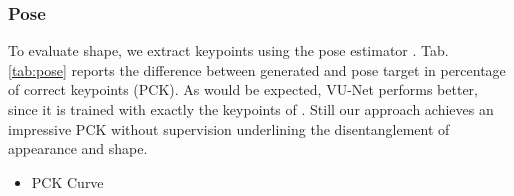 	\subsubsection{Pose}
	To evaluate shape, we extract keypoints using the pose estimator \cite{cao17affinityfield}. Tab. \ref{tab:pose} reports the difference between generated and pose target in percentage of correct keypoints (PCK). As would be expected, VU-Net performs better, since it is trained with exactly the keypoints of \cite{cao17affinityfield}. Still our approach achieves an impressive PCK without supervision underlining the disentanglement of appearance and shape.

	\begin{itemize}
		\item PCK Curve
	\end{itemize}

